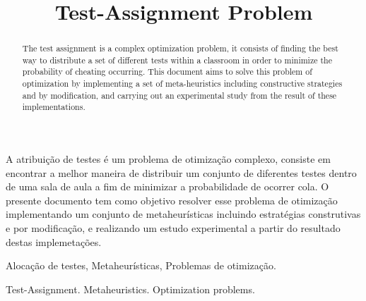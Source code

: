 \documentclass[a4paper,11pt]{article}
\begin{document}
\title{Test-Assignment Problem} 

\maketitle
\thispagestyle{fancy}

\author{
}

\author{ 
}

\vspace{8mm}
\begin{resumo}
A atribui\c c\~ao de testes \'e um problema de otimiza\c c\~ao complexo, consiste em encontrar a melhor maneira de 
distribuir um conjunto de diferentes testes dentro de uma sala de aula a fim de minimizar a probabilidade de ocorrer cola. O presente documento tem como objetivo resolver esse problema de otimiza\c c\~ao implementando 
um conjunto de metaheur\'isticas incluindo estrat\'egias construtivas e por modifica\c c\~ao, e realizando um estudo experimental a partir do resultado 
destas implemeta\c c\~oes.
 \end{resumo}

\bigskip
\begin{palchaves}
Aloca\c c\~ao de testes, Metaheur\'isticas, Problemas de otimiza\c c\~ao.

\end{palchaves}


\vspace{8mm}

\begin{abstract}
The test assignment is a complex optimization problem, it consists of finding the
best way to distribute a set of different tests within a classroom in order to minimize
the probability of cheating occurring. This document aims to solve this problem
of optimization by implementing a set of meta-heuristics including constructive strategies and
by modification, and carrying out an experimental study from the result of these implementations.

\end{abstract}

\bigskip
\begin{keywords}
Test-Assignment. Metaheuristics. Optimization problems.

\end{keywords}
\end{document}
